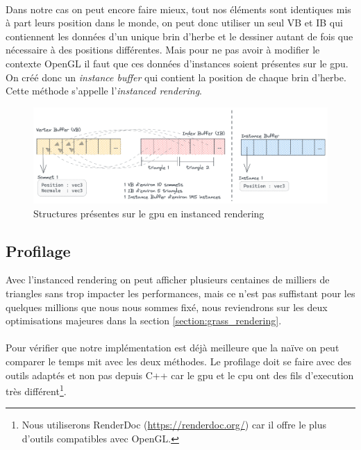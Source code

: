 \documentclass{EPUProjetDi}
\begin{document}
\paragraph{}
Dans notre cas on peut encore faire mieux, tout nos éléments sont identiques mis à part leurs position dans le monde, on peut donc utiliser un seul VB et IB qui contiennent les données d'un unique brin d'herbe et le dessiner autant de fois que nécessaire à des positions différentes. Mais pour ne pas avoir à modifier le contexte OpenGL il faut que ces données d'instances soient présentes sur le gpu. On créé donc un \textit{instance buffer} qui contient la position de chaque brin d'herbe. Cette méthode s'appelle l'\textit{instanced rendering}.

\begin{figure}[ht]
	\centering
	\includegraphics[scale=.4]{grass_vbibib}
	\caption{Structures présentes sur le gpu en instanced rendering}
	\label{fig:grass_vbibib}
\end{figure}

\subsection{Profilage}
Avec l'instanced rendering on peut afficher plusieurs centaines de milliers de triangles sans trop impacter les performances, mais ce n'est pas suffistant pour les quelques millions que nous nous sommes fixé, nous reviendrons sur les deux optimisations majeures dans la section \ref{section:grass_rendering}.
\paragraph{}
 Pour vérifier que notre implémentation est déjà meilleure que la naïve on peut comparer le temps mit avec les deux méthodes. Le profilage doit se faire avec des outils adaptés et non pas depuis C++ car le gpu et le cpu ont des fils d'execution très différent\footnote{Nous utiliserons RenderDoc (\url{https://renderdoc.org/}) car il offre le plus d'outils compatibles avec OpenGL.}.
\end{document}
